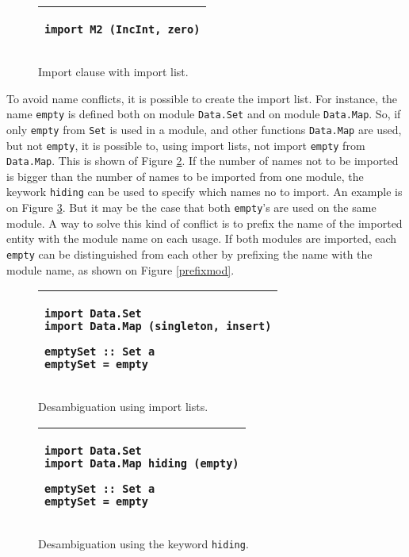 \documentclass[msc]{ppgccufmg}
\begin{document}
\begin{figure}
\caption{Import clause with import list.\label{imp2}}
\begin{tabular}{|p{\textwidth}|}
\hline
\begin{verbatim}
import M2 (IncInt, zero)
\end{verbatim}
\\
\hline
\end{tabular}
\end{figure}

To avoid name conflicts, it is possible to create the import list.
For instance, the name \texttt{empty} is defined both on module \texttt{Data.Set} and on module \texttt{Data.Map}.
So, if only \texttt{empty} from \texttt{Set} is used in a module, and other functions \texttt{Data.Map} are used, but not \texttt{empty}, it is possible to, using import lists, not import \texttt{empty} from \texttt{Data.Map}.
This is shown of Figure \ref{implistmod}.
If the number of names not to be imported is bigger than the number of names to be imported from one module, the keywork \texttt{hiding} can be used to specify which names no to import.
An example is on Figure \ref{hiding}.
But it may be the case that both \texttt{empty}'s are used on the same module.
A way to solve this kind of conflict is to prefix the name of the imported entity with the module name on each usage.
If both modules are imported, each \texttt{empty} can be distinguished from each other by prefixing the name with the module name, as shown on Figure \ref{prefixmod}.

\begin{figure}
\caption{Desambiguation using import lists.\label{implistmod}}
\begin{tabular}{|p{\textwidth}|}
\hline
\begin{verbatim}
import Data.Set
import Data.Map (singleton, insert)

emptySet :: Set a
emptySet = empty
\end{verbatim}
\\
\hline
\end{tabular}
\end{figure}

\begin{figure}
\caption{Desambiguation using the keyword \texttt{hiding}.\label{hiding}}
\begin{tabular}{|p{\textwidth}|}
\hline
\begin{verbatim}
import Data.Set
import Data.Map hiding (empty)

emptySet :: Set a
emptySet = empty
\end{verbatim}
\\
\hline
\end{tabular}
\end{figure}
\end{document}
